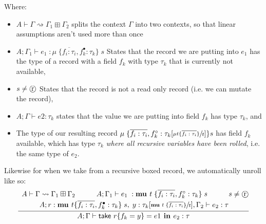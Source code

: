 Where:
\begin{itemize}
    \item $A \vdash \Gamma \rightsquigarrow \Gamma_1 \boxplus \Gamma_2$ splits the context $\Gamma$ into two contexts, so that linear assumptions aren't used 
          more than once
    \item $A;\Gamma_1 \vdash e_1\; : \mu\; \{ \overline{f_i : \tau_i}, f_k^\bullet : \tau_k \}\; s$ States that the record we are putting into $e_1$
          has the type of a record with a field $f_k$ with type $\tau_k$ that is currently not available,
    \item $s \neq \text{\textcircled{r}}   \vspace{0.5em}$ States that the record is not a read only record (i.e. we can mutate the record),
    \item $A;\Gamma \vdash e2 : \tau_k$ states that
          the value we are putting into field $f_k$ has type $\tau_k$, and
    \item The type of our resulting record $\mu\; \{ \overline{f_i : \tau_i}, f_k^\circ : \tau_k[\sfrac{ \mu t \{\overline{f_i : \tau_i} \}}{t}] \} s$
          has field $f_k$ available, which has type $\tau_k$ \textit{where all recursive variables have been rolled}, i.e. the same type of $e_2$.
\end{itemize}

Likewise for when we \textsf{take} from a recursive boxed record, 
we automatically unroll like so:
\begin{align*}
    \infer{
        A;\Gamma \vdash \textsf{take } r \{ f_k = y \} = e1 \textbf{ in } e_2 : \tau
    }{
        \begin{array}{c@{}c@{}c@{}c@{}}
            A \vdash \Gamma \rightsquigarrow \Gamma_1 \boxplus \Gamma_2 
            &
            A;\Gamma_1 \vdash e_1\; : \textbf{mu } t\; \{ \overline{f_i : \tau_i}, f_k^\circ : \tau_k \}\; s 
            &
            s \neq \text{\textcircled{r}}   \vspace{0.25em} \\
            &
            \hspace{-5em}A; r : \textbf{mu } t \{ \overline{f_i : \tau_i}, f_k^\bullet : \tau_k \}\; s
            ,\; y : \tau_k[\sfrac{ \textbf{mu } t\; \{\overline{f_i : \tau_i} \}}{t}], \Gamma_2 \vdash e_2 : \tau
        \end{array}
    }
\end{align*}

